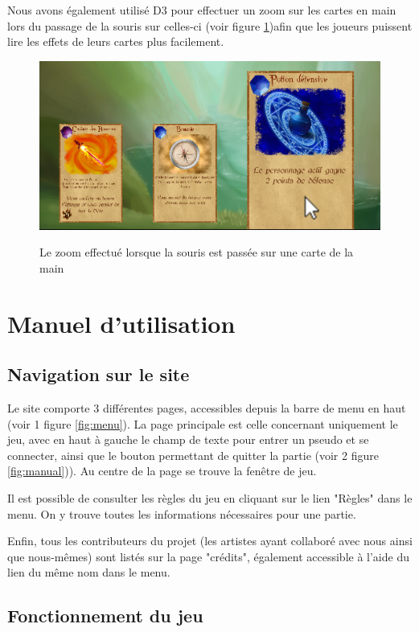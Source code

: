 \documentclass[12pt]{report}
\begin{document}
        Nous avons également utilisé D3 pour effectuer un zoom sur les cartes en main lors du passage de la souris sur celles-ci (voir figure \ref{fig:zoom})afin que les joueurs puissent lire les effets de leurs cartes plus facilement.

		\begin{figure}[h!]
			\centering
			\includegraphics[scale=0.6]{zoom}
			\label{fig:zoom}
			\caption{Le zoom effectué lorsque la souris est passée sur une carte de la main}
		\end{figure}


\chapter{Manuel d'utilisation}

    \section{Navigation sur le site}

    Le site comporte 3 différentes pages, accessibles depuis la barre de menu en haut (voir 1 figure \ref{fig:menu}). La page principale est celle concernant uniquement le jeu, avec en haut à gauche le champ de texte pour entrer un pseudo et se connecter, ainsi que le bouton permettant de quitter la partie (voir 2 figure \ref{fig:manual})). Au centre de la page se trouve la fenêtre de jeu.

    Il est possible de consulter les règles du jeu en cliquant sur le lien "Règles" dans le menu. On y trouve toutes les informations nécessaires pour une partie.

    Enfin, tous les contributeurs du projet (les artistes ayant collaboré avec nous ainsi que nous-mêmes) sont listés sur la page "crédits", également accessible à l'aide du lien du même nom dans le menu.

    \section{Fonctionnement du jeu}
\end{document}
